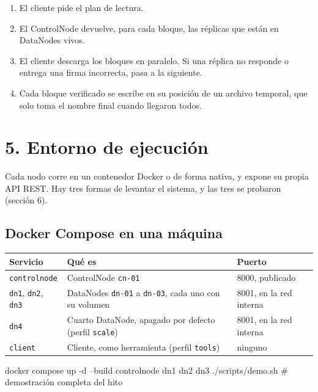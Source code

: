 \documentclass[10pt]{article}
\begin{document}
\begin{enumerate}
\item El cliente pide el plan de lectura.
\item El ControlNode devuelve, para cada bloque, las réplicas que están en DataNodes vivos.
\item El cliente descarga los bloques en paralelo. Si una réplica no responde o entrega una firma incorrecta, pasa a la siguiente.
\item Cada bloque verificado se escribe en su posición de un archivo temporal, que solo toma el nombre final cuando llegaron todos.
\end{enumerate}

\separador

\section{5. Entorno de ejecución}

Cada nodo corre en un contenedor Docker o de forma nativa, y expone su propia API REST. Hay tres formas de levantar el sistema, y las tres se probaron (sección 6).

\subsection{Docker Compose en una máquina}

\begin{xltabular}{\linewidth}{@{}L{3.2cm}YL{3.2cm}@{}}
\toprule
Servicio & Qué es & Puerto \\
\midrule\endhead
\texttt{controlnode} & ControlNode \texttt{cn-01} & 8000, publicado \\
\texttt{dn1}, \texttt{dn2}, \texttt{dn3} & DataNodes \texttt{dn-01} a \texttt{dn-03}, cada uno con su volumen & 8001, en la red interna \\
\texttt{dn4} & Cuarto DataNode, apagado por defecto (perfil \texttt{scale}) & 8001, en la red interna \\
\texttt{client} & Cliente, como herramienta (perfil \texttt{tools}) & ninguno \\
\bottomrule
\end{xltabular}

\begin{codigo}
docker compose up -d --build controlnode dn1 dn2 dn3
./scripts/demo.sh                       # demostración completa del hito
\end{codigo}
\end{document}
